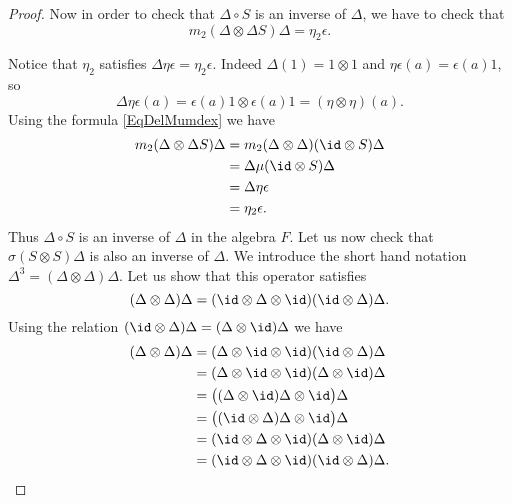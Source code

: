 \begin{proof}
    Now in order to check that \( \Delta\circ S\) is an inverse of \( \Delta\), we have to check that
    \begin{equation}
        m_2(\Delta\otimes \Delta S)\Delta=\eta_2\epsilon.
    \end{equation}

    Notice that \( \eta_2\) satisfies \( \Delta\eta\epsilon=\eta_2\epsilon\). Indeed \( \Delta(1)=1\otimes 1\) and \( \eta\epsilon(a)=\epsilon(a)1\), so
    \begin{equation}
        \Delta\eta\epsilon(a)=\epsilon(a)1\otimes\epsilon(a)1=(\eta\otimes \eta)(a).
    \end{equation}
    Using the formula \eqref{EqDelMumdex} we have
    \begin{equation}
        \begin{aligned}[]
            m_2(\Delta\otimes\Delta S)\Delta&=m_2(\Delta\otimes\Delta)(\id\otimes S)\Delta\\
            &=\Delta\mu(\id\otimes S)\Delta\\
            &=\Delta\eta\epsilon\\
            &=\eta_2\epsilon.
        \end{aligned}
    \end{equation}
    Thus \( \Delta\circ S\) is an inverse of \( \Delta\) in the algebra \( F\). Let us now check that \( \sigma(S\otimes S)\Delta\) is also an inverse of \( \Delta\). We introduce the short hand notation \( \Delta^3=(\Delta\otimes \Delta)\Delta\). Let us show that this operator satisfies
    \begin{equation}        \label{EqDDDrelDifetc}
        (\Delta\otimes\Delta)\Delta=(\id\otimes\Delta\otimes\id)(\id\otimes\Delta)\Delta.
    \end{equation}
    Using the relation \( (\id\otimes\Delta)\Delta=(\Delta\otimes\id)\Delta\) we have
    \begin{equation}
        \begin{aligned}[]
            (\Delta\otimes\Delta)\Delta&=(\Delta\otimes\id\otimes\id)(\id\otimes\Delta)\Delta\\
            &=(\Delta\otimes\id\otimes\id)(\Delta\otimes\id)\Delta\\
            &=\big( (\Delta\otimes\id)\Delta\otimes\id \big)\Delta\\
            &=\big( (\id\otimes\Delta)\Delta\otimes\id \big)\Delta\\
            &=(\id\otimes\Delta\otimes\id)(\Delta\otimes\id)\Delta\\
            &=(\id\otimes\Delta\otimes\id)(\id\otimes\Delta)\Delta.
        \end{aligned}
    \end{equation}
    

\end{proof}
